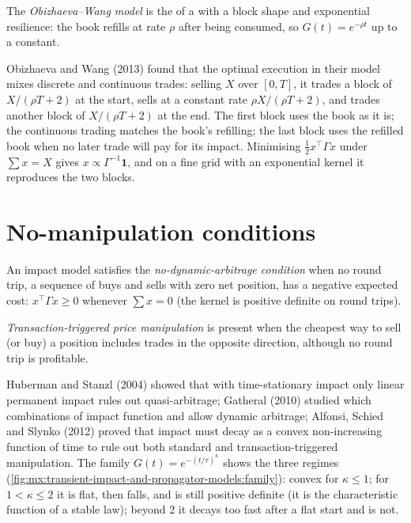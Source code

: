 \begin{definition}\label{def:mx:transient-impact-and-propagator-models:ow}
The \emph{Obizhaeva--Wang model} is the  of a  with a block shape and exponential
resilience: the book refills at rate $\rho$ after being consumed, so $G(t)=e^{-\rho t}$ up to a constant.
\end{definition}

Obizhaeva and Wang (2013) found that the optimal execution in their model mixes discrete and continuous trades: selling $X$ over $[0,T]$, it trades a block
of $X/(\rho T+2)$ at the start, sells at a constant rate $\rho X/(\rho T+2)$, and trades another block of $X/(\rho T+2)$ at the end. The first block uses the
book as it is; the continuous trading matches the book's refilling; the last block uses the refilled book when no later trade will pay for its impact.
Minimising $\tfrac12x^\top\Gamma x$ under $\sum x=X$ gives $x\propto\Gamma^{-1}\mathbf 1$, and on a fine grid with an exponential kernel it reproduces the
two blocks.

\section{No-manipulation conditions}

\begin{definition}\label{def:mx:transient-impact-and-propagator-models:nda}
An impact model satisfies the \emph{no-dynamic-arbitrage condition} when no round trip, a sequence of buys and sells
with zero net position, has a negative expected cost: $x^\top\Gamma x\ge0$ whenever $\sum x=0$ (the kernel is positive definite on round trips).
\end{definition}

\begin{definition}\label{def:mx:transient-impact-and-propagator-models:ttpm}
\emph{Transaction-triggered price manipulation} is present when the cheapest way to sell (or buy) a
position includes trades in the opposite direction, although no round trip is profitable.
\end{definition}

Huberman and Stanzl (2004) showed that with time-stationary impact only linear permanent impact rules out quasi-arbitrage; Gatheral (2010) studied which
combinations of impact function and  allow dynamic arbitrage; Alfonsi, Schied and Slynko (2012) proved that impact must decay as a convex
non-increasing function of time to rule out both standard and transaction-triggered manipulation. The family $G(t)=e^{-(t/\tau)^\kappa}$ shows the
three regimes (\cref{fig:mx:transient-impact-and-propagator-models:family}): convex for $\kappa\le1$; for $1<\kappa\le2$ it is flat, then falls, and is
still positive definite (it is the characteristic function of a stable law); beyond 2 it decays too fast after a flat start and is not.

